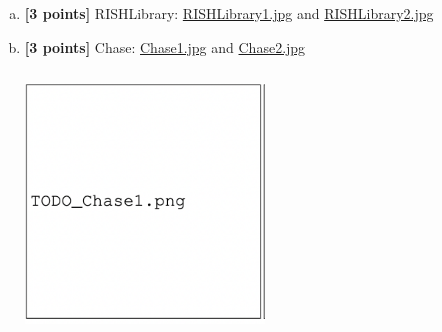 \documentclass[11pt]{article}
\begin{document}
\begin{enumerate}[(a)]
    \item \textbf{[3 points]}
    RISHLibrary: 
    \href{images/RISHLibrary1.jpg}{RISHLibrary1.jpg} and \href{images/RISHLibrary2.jpg}{RISHLibrary2.jpg} 

    \pagebreak
    \item \textbf{[3 points]}
    Chase:
    \href{images/Chase1.jpg}{Chase1.jpg} and \href{images/Chase2.jpg}{Chase2.jpg}
    \begin{tcolorbox}[colback=white!5!white,colframe=green!75!black]
    \includegraphics[width=0.5\textwidth,height=7cm,keepaspectratio]{images/TODO_Chase1.png}
    

\end{tcolorbox}
\end{enumerate}
\end{document}
